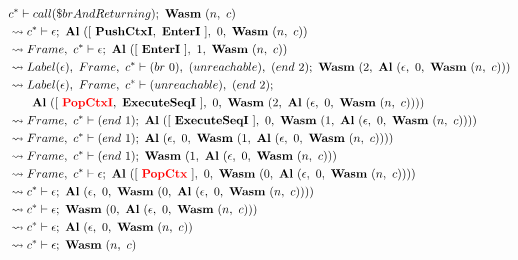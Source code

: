  \\
\begin{align}
  &c^* \vdash call(\$brAndReturning); ~ \textbf{Wasm} ~ (n, ~ c)
  \label{eq:resolve-1} \\
  &\leadsto c^* \vdash \epsilon; ~ \textbf{Al} ~ ([ ~ \textbf{PushCtxI}, ~ \textbf{EnterI} ~ ], ~ 0, ~ \textbf{Wasm} ~ (n, ~ c))
  \label{eq:resolve-2} \\
  &\leadsto Frame, ~ c^* \vdash \epsilon; ~ \textbf{Al} ~ ([ ~ \textbf{EnterI} ~ ], ~ 1, ~ \textbf{Wasm} ~ (n, ~ c))
  \label{eq:resolve-3} \\
  &\leadsto Label(\epsilon), ~ Frame, ~ c^* \vdash (br ~ 0), ~ (unreachable), ~ (end ~ 2); ~
    \textbf{Wasm} ~ (2, ~ \textbf{Al} ~ (\epsilon, ~ 0, ~ \textbf{Wasm} ~ (n, ~ c)))
  \label{eq:resolve-4} \\
  &\leadsto Label(\epsilon), ~ Frame, ~ c^* \vdash (unreachable), ~ (end ~ 2); \\
  &\quad\quad \textbf{Al} ~ ([ ~ \textcolor{red}{\textbf{PopCtxI}}, ~ \textbf{ExecuteSeqI} ~ ], ~ 0, ~ \textbf{Wasm} ~ (2, ~ \textbf{Al} ~ (\epsilon, ~ 0, ~ \textbf{Wasm} ~ (n, ~ c))))
  \label{eq:resolve-5} \\
  &\leadsto Frame, ~ c^* \vdash (end ~ 1); ~
    \textbf{Al} ~ ([ ~ \textbf{ExecuteSeqI} ~ ], ~ 0, ~ \textbf{Wasm} ~ (1, ~ \textbf{Al} ~ (\epsilon, ~ 0, ~ \textbf{Wasm} ~ (n, ~ c))))
  \label{eq:resolve-6} \\
  &\leadsto Frame, ~ c^* \vdash (end ~ 1); ~
    \textbf{Al} ~ (\epsilon, ~ 0, ~ \textbf{Wasm} ~ (1, ~ \textbf{Al} ~ (\epsilon, ~ 0, ~ \textbf{Wasm} ~ (n, ~ c))))
  \label{eq:resolve-7} \\
  &\leadsto Frame, ~ c^* \vdash (end ~ 1); ~ \textbf{Wasm} ~ (1, ~ \textbf{Al} ~ (\epsilon, ~ 0, ~ \textbf{Wasm} ~ (n, ~ c)))
  \label{eq:resolve-8} \\
  &\leadsto Frame, ~ c^* \vdash \epsilon; ~
    \textbf{Al} ~ ([ ~ \textcolor{red}{\textbf{PopCtx}} ~ ], ~ 0, ~ \textbf{Wasm} ~ (0, ~ \textbf{Al} ~ (\epsilon, ~ 0, ~ \textbf{Wasm} ~ (n, ~ c))))
  \label{eq:resolve-9} \\
  &\leadsto c^* \vdash \epsilon; ~
    \textbf{Al} ~ (\epsilon, ~ 0, ~ \textbf{Wasm} ~ (0, ~ \textbf{Al} ~ (\epsilon, ~ 0, ~ \textbf{Wasm} ~ (n, ~ c))))
  \label{eq:resolve-10} \\
  &\leadsto c^* \vdash \epsilon; ~ \textbf{Wasm} ~ (0, ~ \textbf{Al} ~ (\epsilon, ~ 0, ~ \textbf{Wasm} ~ (n, ~ c)))
  \label{eq:resolve-11} \\
  &\leadsto c^* \vdash \epsilon; ~ \textbf{Al} ~ (\epsilon, ~ 0, ~ \textbf{Wasm} ~ (n, ~ c))
  \label{eq:resolve-12} \\
  &\leadsto c^* \vdash \epsilon; ~ \textbf{Wasm} ~ (n, ~ c)
  \label{eq:resolve-13}
\end{align}
